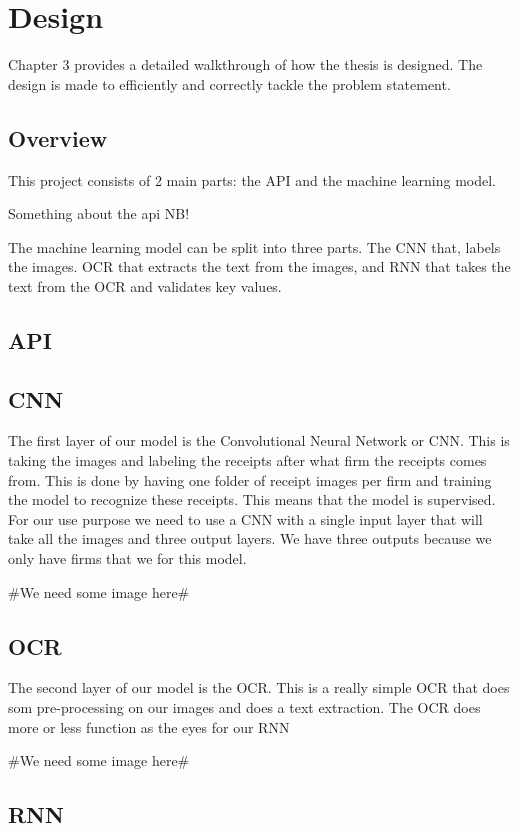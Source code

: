 \chapter{Design}
\label{ch:design}
Chapter 3 provides a detailed walkthrough of how the thesis is designed.
The design is made to efficiently and correctly tackle the problem statement.


\section{Overview}\label{sec:Overview}

This project consists of 2 main parts: the API and the machine learning model.

Something about the api NB!

The machine learning model can be split into three parts.
The CNN that, labels the images.
OCR that extracts the text from the images, and RNN that takes the text from the OCR and validates key values.


\section{API}\label{sec:API}


\section{CNN}\label{sec:CNN}

The first layer of our model is the Convolutional Neural Network or CNN. This is taking the images and labeling the receipts after what firm the receipts comes from.
This is done by having one folder of receipt images per firm and training the model to recognize these receipts.
This means that the model is supervised.
For our use purpose we need to use a CNN with a single input layer that will take all the images and three output layers.
We have three outputs because we only have firms that we for this model.

#We need some image here#

\section{OCR}\label{sec:OCR}

The second layer of our model is the OCR. This is a really simple OCR that does som pre-processing on our images and does a text extraction.
The OCR does more or less function as the eyes for our RNN

#We need some image here#

\section{RNN}\label{sec:RNN}
